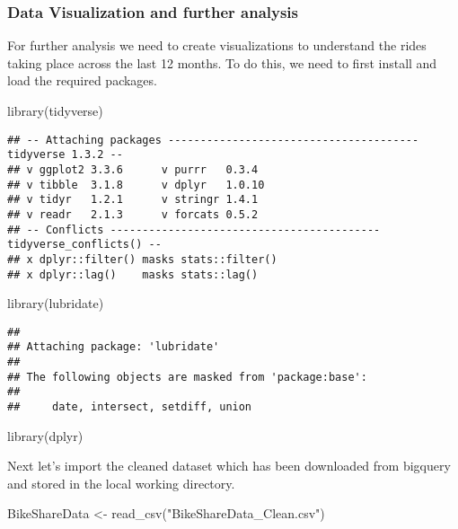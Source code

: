 \documentclass[
]{article}
\newenvironment{Shaded}{\begin{snugshade}}{\end{snugshade}}
\newcommand{\FunctionTok}[1]{\textcolor[rgb]{0.00,0.00,0.00}{#1}}
\newcommand{\NormalTok}[1]{#1}
\newcommand{\OtherTok}[1]{\textcolor[rgb]{0.56,0.35,0.01}{#1}}
\newcommand{\StringTok}[1]{\textcolor[rgb]{0.31,0.60,0.02}{#1}}
\begin{document}
\hypertarget{data-visualization-and-further-analysis}{%
\subsubsection{Data Visualization and further
analysis}\label{data-visualization-and-further-analysis}}

For further analysis we need to create visualizations to understand the
rides taking place across the last 12 months. To do this, we need to
first install and load the required packages.

\begin{Shaded}
\begin{Highlighting}[]
\FunctionTok{library}\NormalTok{(tidyverse)}
\end{Highlighting}
\end{Shaded}

\begin{verbatim}
## -- Attaching packages --------------------------------------- tidyverse 1.3.2 --
## v ggplot2 3.3.6      v purrr   0.3.4 
## v tibble  3.1.8      v dplyr   1.0.10
## v tidyr   1.2.1      v stringr 1.4.1 
## v readr   2.1.3      v forcats 0.5.2 
## -- Conflicts ------------------------------------------ tidyverse_conflicts() --
## x dplyr::filter() masks stats::filter()
## x dplyr::lag()    masks stats::lag()
\end{verbatim}

\begin{Shaded}
\begin{Highlighting}[]
\FunctionTok{library}\NormalTok{(lubridate)}
\end{Highlighting}
\end{Shaded}

\begin{verbatim}
## 
## Attaching package: 'lubridate'
## 
## The following objects are masked from 'package:base':
## 
##     date, intersect, setdiff, union
\end{verbatim}

\begin{Shaded}
\begin{Highlighting}[]
\FunctionTok{library}\NormalTok{(dplyr)}
\end{Highlighting}
\end{Shaded}

Next let's import the cleaned dataset which has been downloaded from
bigquery and stored in the local working directory.

\begin{Shaded}
\begin{Highlighting}[]
\NormalTok{BikeShareData }\OtherTok{\textless{}{-}} \FunctionTok{read\_csv}\NormalTok{(}\StringTok{"BikeShareData\_Clean.csv"}\NormalTok{)}
\end{Highlighting}
\end{Shaded}
\end{document}
